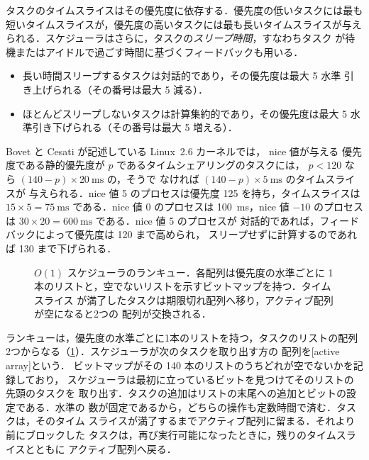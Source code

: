 \documentclass[../main.tex]{subfiles}
\begin{document}
タスクのタイムスライスはその優先度に依存する．優先度の低いタスクには最も
短いタイムスライスが，優先度の高いタスクには最も長いタイムスライスが与え
られる．スケジューラはさらに，タスクの\emph{スリープ時間}，すなわちタスク
が待機またはアイドルで過ごす時間に基づくフィードバックも用いる．
\begin{itemize}
  \item 長い時間スリープするタスクは対話的であり，その優先度は最大 5 水準
    引き上げられる（その番号は最大 5 減る）．
  \item ほとんどスリープしないタスクは計算集約的であり，その優先度は最大
    5 水準引き下げられる（その番号は最大 5 増える）．
\end{itemize}

\begin{example}
  Bovet と Cesati が記述している Linux~2.6 カーネルでは，%
  nice 値が与える
  優先度である静的優先度が $p$ であるタイムシェアリングのタスクには，
  $p < 120$ なら $(140 - p) \times \SI{20}{\milli\second}$ の，そうで
  なければ $(140 - p) \times \SI{5}{\milli\second}$ のタイムスライスが
  与えられる．nice 値 5 のプロセスは優先度 125 を持ち，タイムスライスは
  $15 \times 5 = \SI{75}{\milli\second}$ である．nice 値 0 のプロセスは
  \SI{100}{\milli\second}，nice 値 $-10$ のプロセスは
  $30 \times 20 = \SI{600}{\milli\second}$ である．nice 値 5 のプロセスが
  対話的であれば，フィードバックによって優先度は 120 まで高められ，
  スリープせずに計算するのであれば 130 まで下げられる．
\end{example}

\begin{figure}[htbp]
  \centering
  
  \caption{$O(1)$ スケジューラのランキュー．各配列は優先度の水準ごとに
    1本のリストと，空でないリストを示すビットマップを持つ．タイムスライス
    が満了したタスクは期限切れ配列へ移り，アクティブ配列が空になると2つの
    配列が交換される．}
  \label{fig:l07-o1}
\end{figure}

ランキューは，優先度の水準ごとに1本のリストを持つ，タスクのリストの配列
2つからなる（\cref{fig:l07-o1}）．スケジューラが次のタスクを取り出す方の
配列を[active array]という．
ビットマップがその 140 本のリストのうちどれが空でないかを記録しており，
スケジューラは最初に立っているビットを見つけてそのリストの先頭のタスクを
取り出す．タスクの追加はリストの末尾への追加とビットの設定である．水準の
数が固定であるから，どちらの操作も定数時間で済む．タスクは，そのタイム
スライスが満了するまでアクティブ配列に留まる．それより前にブロックした
タスクは，再び実行可能になったときに，残りのタイムスライスとともに
アクティブ配列へ戻る．
\end{document}

